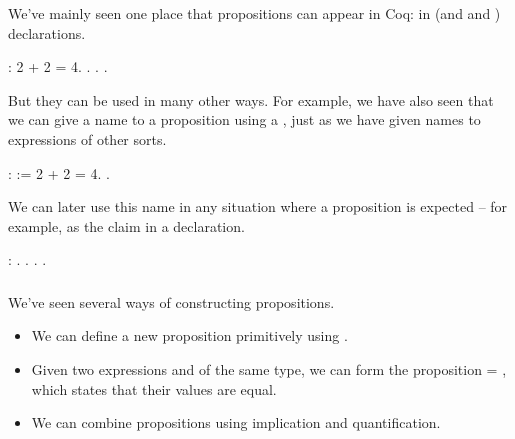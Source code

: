 \documentclass[12pt]{report}
\begin{document}
 We've mainly seen one place that propositions can appear in Coq: in
     (and  and ) declarations. \begin{coqdoccode}
\coqdocemptyline
\coqdocnoindent
{}  : \coqdoceol
\coqdocindent{1.00em}
2 + 2 = 4.\coqdoceol
\coqdocnoindent
{}. . .\coqdoceol
\coqdocemptyline
\end{coqdoccode}
But they can be used in many other ways.  For example, we have also seen that
    we can give a name to a proposition using a , just as we have
    given names to expressions of other sorts. \begin{coqdoccode}
\coqdocemptyline
\coqdocnoindent
{}  :   :=  2 + 2 = 4.\coqdoceol
\coqdocnoindent
{} .\coqdoceol
\coqdocemptyline
\end{coqdoccode}
We can later use this name in any situation where a proposition is
    expected -- for example, as the claim in a  declaration. \begin{coqdoccode}
\coqdocemptyline
\coqdocnoindent
{}  : \coqdoceol
\coqdocindent{1.00em}
.\coqdoceol
\coqdocnoindent
{}. . .\coqdoceol
\coqdocemptyline
\end{coqdoccode}
\subsubsection{ }

 We've seen several ways of constructing propositions.  



\begin{itemize}
\item  We can define a new proposition primitively using .



\item  Given two expressions  and  of the same type, we can
         form the proposition  = , which states that their
         values are equal.



\item  We can combine propositions using implication and
         quantification. 
\end{itemize}
\end{document}
